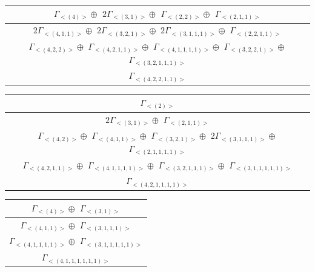 \bigskip
\begin{minipage}{1\textwidth}
\centering
\begin{tabular}{|c|}\hline
$\Gamma_{<(
4
)>} \oplus$
$ 2 \Gamma_{<(
3 , 
1
)>} \oplus$
$\Gamma_{<(
2 , 
2
)>} \oplus$
$\Gamma_{<(
2 , 
1 , 
1
)>}$
\\ \hline
$ 2 \Gamma_{<(
4 , 
1 , 
1
)>} \oplus$
$ 2 \Gamma_{<(
3 , 
2 , 
1
)>} \oplus$
$ 2 \Gamma_{<(
3 , 
1 , 
1 , 
1
)>} \oplus$
$\Gamma_{<(
2 , 
2 , 
1 , 
1
)>}$
\\ \hline
$\Gamma_{<(
4 , 
2 , 
2
)>} \oplus$
$\Gamma_{<(
4 , 
2 , 
1 , 
1
)>} \oplus$
$\Gamma_{<(
4 , 
1 , 
1 , 
1 , 
1
)>} \oplus$
$\Gamma_{<(
3 , 
2 , 
2 , 
1
)>} \oplus$
$\Gamma_{<(
3 , 
2 , 
1 , 
1 , 
1
)>}$
\\ \hline
$\Gamma_{<(
4 , 
2 , 
2 , 
1 , 
1
)>}$
\\
\hline\end{tabular}\end{minipage}
\bigskip
\begin{minipage}{1\textwidth}
\centering
\begin{tabular}{|c|}\hline
$\Gamma_{<(
2
)>}$
\\ \hline
$ 2 \Gamma_{<(
3 , 
1
)>} \oplus$
$\Gamma_{<(
2 , 
1 , 
1
)>}$
\\ \hline
$\Gamma_{<(
4 , 
2
)>} \oplus$
$\Gamma_{<(
4 , 
1 , 
1
)>} \oplus$
$\Gamma_{<(
3 , 
2 , 
1
)>} \oplus$
$ 2 \Gamma_{<(
3 , 
1 , 
1 , 
1
)>} \oplus$
$\Gamma_{<(
2 , 
1 , 
1 , 
1 , 
1
)>}$
\\ \hline
$\Gamma_{<(
4 , 
2 , 
1 , 
1
)>} \oplus$
$\Gamma_{<(
4 , 
1 , 
1 , 
1 , 
1
)>} \oplus$
$\Gamma_{<(
3 , 
2 , 
1 , 
1 , 
1
)>} \oplus$
$\Gamma_{<(
3 , 
1 , 
1 , 
1 , 
1 , 
1
)>}$
\\ \hline
$\Gamma_{<(
4 , 
2 , 
1 , 
1 , 
1 , 
1
)>}$
\\
\hline\end{tabular}\end{minipage}
\bigskip
\begin{minipage}{.3\textwidth}
\centering
\begin{tabular}{|c|}\hline
$\Gamma_{<(
4
)>} \oplus$
$\Gamma_{<(
3 , 
1
)>}$
\\ \hline
$\Gamma_{<(
4 , 
1 , 
1
)>} \oplus$
$\Gamma_{<(
3 , 
1 , 
1 , 
1
)>}$
\\ \hline
$\Gamma_{<(
4 , 
1 , 
1 , 
1 , 
1
)>} \oplus$
$\Gamma_{<(
3 , 
1 , 
1 , 
1 , 
1 , 
1
)>}$
\\ \hline
$\Gamma_{<(
4 , 
1 , 
1 , 
1 , 
1 , 
1 , 
1
)>}$
\\
\hline\end{tabular}\end{minipage}
